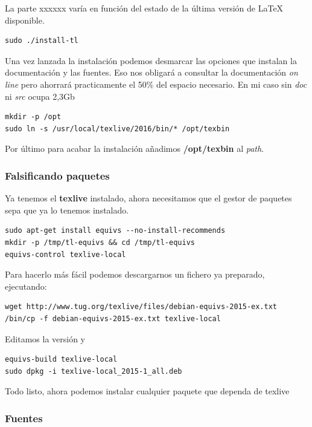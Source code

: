 \documentclass[12pt,spanish,]{article}
\begin{document}
La parte xxxxxx varía en función del estado de la última versión de
LaTeX disponible.

\begin{verbatim}
sudo ./install-tl
\end{verbatim}

Una vez lanzada la instalación podemos desmarcar las opciones que
instalan la documentación y las fuentes. Eso nos obligará a consultar la
documentación \emph{on line} pero ahorrará practicamente el 50\% del
espacio necesario. En mi caso sin \emph{doc} ni \emph{src} ocupa 2,3Gb

\begin{verbatim}
mkdir -p /opt
sudo ln -s /usr/local/texlive/2016/bin/* /opt/texbin
\end{verbatim}

Por último para acabar la instalación añadimos \textbf{/opt/texbin} al
\emph{path}.

\subsubsection{Falsificando paquetes}\label{falsificando-paquetes}

Ya tenemos el \textbf{texlive} instalado, ahora necesitamos que el
gestor de paquetes sepa que ya lo tenemos instalado.

\begin{verbatim}
sudo apt-get install equivs --no-install-recommends
mkdir -p /tmp/tl-equivs && cd /tmp/tl-equivs
equivs-control texlive-local
\end{verbatim}

Para hacerlo más fácil podemos descargarnos un fichero ya preparado,
ejecutando:

\begin{verbatim}
wget http://www.tug.org/texlive/files/debian-equivs-2015-ex.txt
/bin/cp -f debian-equivs-2015-ex.txt texlive-local
\end{verbatim}

Editamos la versión y

\begin{verbatim}
equivs-build texlive-local
sudo dpkg -i texlive-local_2015-1_all.deb
\end{verbatim}

Todo listo, ahora podemos instalar cualquier paquete que dependa de
texlive

\subsubsection{Fuentes}\label{fuentes}
\end{document}
